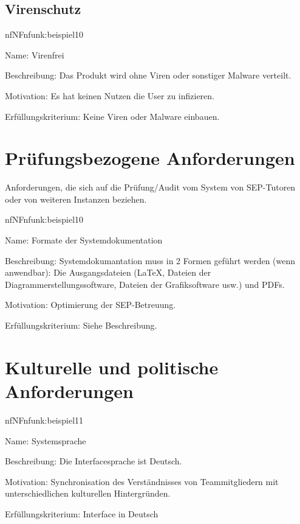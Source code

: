 \subsection{Virenschutz}

\begin{description}[leftmargin=5em, style=sameline]	
	\begin{lhp}{nf}{NF}{nfunk:beispiel10}
		\item [Name:] Virenfrei %
		\item [Beschreibung:] Das Produkt wird ohne Viren oder sonstiger Malware verteilt. %
		\item [Motivation:] Es hat keinen Nutzen die User zu infizieren. %
		\item [Erfüllungskriterium:] Keine Viren oder Malware einbauen.
	\end{lhp}
\end{description}

\section{Prüfungsbezogene Anforderungen}

Anforderungen, die sich auf die Prüfung/Audit vom System von SEP-Tutoren oder von weiteren Instanzen beziehen.


\begin{description}[leftmargin=5em, style=sameline]	
	\begin{lhp}{nf}{NF}{nfunk:beispiel10}
		\item [Name:] Formate der Systemdokumentation
		\item [Beschreibung:] Systemdokumantation muss in 2 Formen geführt werden (wenn anwendbar): Die Ausgangsdateien (\LaTeX, Dateien der Diagrammerstellungssoftware, Dateien der Grafiksoftware usw.) und PDFs.
		\item [Motivation:] Optimierung der SEP-Betreuung.
		\item [Erfüllungskriterium:] Siehe Beschreibung.
	\end{lhp}
\end{description}

\section{Kulturelle und politische Anforderungen}


\begin{description}[leftmargin=5em, style=sameline]	
	\begin{lhp}{nf}{NF}{nfunk:beispiel11}
		\item [Name:] Systemsprache
		\item [Beschreibung:] Die Interfacesprache ist Deutsch.
		\item [Motivation:] Synchronisation des Verständnisses von Teammitgliedern mit unterschiedlichen kulturellen Hintergründen.
		\item [Erfüllungskriterium:] Interface in Deutsch %
	\end{lhp}
\end{description}

